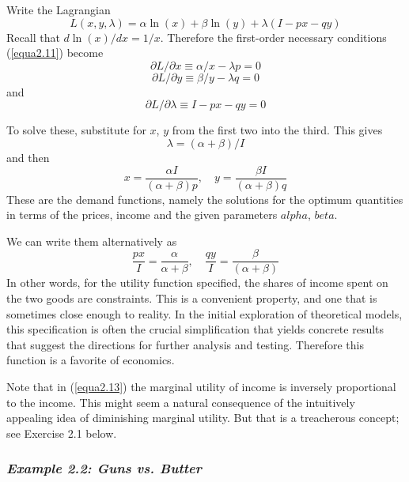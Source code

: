 Write the Lagrangian
\begin{equation*}
L(x,y,\lambda) = \alpha \ln(x) + \beta \ln(y) + \lambda( I-px-qy )
\end{equation*}
Recall that $d\ln(x)/dx=1/x$. Therefore the first-order necessary conditions (\ref{equa2.11}) become
\begin{equation*}
\partial L / \partial x \equiv \alpha / x - \lambda p = 0 
\end{equation*}
\begin{equation*}
\partial L / \partial y \equiv \beta / y - \lambda q = 0
\end{equation*}
and
\begin{equation*}
\partial L / \partial \lambda \equiv I - px - qy = 0
\end{equation*}

To solve these, substitute for $x$, $y$ from the first two into the third. This gives
\begin{equation} \label{equa2.13}
\lambda = ( \alpha + \beta ) /I 
\end{equation}
and then 
\begin{equation} \label{equa2.14}
x =  \dfrac{\alpha I}{(\alpha + \beta)p}, \quad y= \dfrac{\beta I}{(\alpha + \beta)q} 
\end{equation}
These are the demand functions, namely the solutions for the optimum quantities in terms of the prices, income and the given parameters $alpha$, $beta$.

We can write them alternatively as 
\begin{equation} \label{equa2.15}
\dfrac{px}{I} =  \dfrac{\alpha }{\alpha + \beta}, \quad \dfrac{qy}{I}= \dfrac{\beta }{(\alpha + \beta)} 
\end{equation}
In other words, for the utility function specified, the shares of income spent on the two goods are constraints. This is a convenient property, and one that is sometimes close enough to reality. In the initial exploration of theoretical models, this specification is often the crucial simplification that yields concrete results that suggest the directions for further analysis and testing. Therefore this function is a favorite of economics.

Note that in (\ref{equa2.13}) the marginal utility of income is inversely proportional to the income. This might seem a natural consequence of the intuitively appealing idea of diminishing marginal utility. But that is a treacherous concept; see Exercise 2.1 below.

\subsubsection*{\textit{Example 2.2: Guns vs. Butter} }

